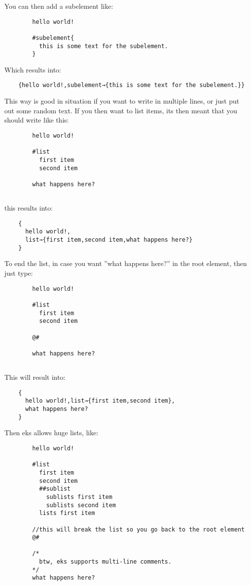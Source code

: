 \documentclass{book}
\begin{document}
	You can then add a subelement like:
	
	\begin{verbatim}
		hello world!
		
		#subelement{
		  this is some text for the subelement.
		}
	\end{verbatim}
	
	Which results into:
	
	\begin{verbatim}
	{hello world!,subelement→{this is some text for the subelement.}}
	\end{verbatim}
	
	This way is good in situation if you want to write in multiple lines, or just put out some random text.
	If you then want to list items, its then meant that you should write like this:
	
	\begin{verbatim}
		hello world!
		
		#list
		  first item
		  second item
			
		what happens here?
		
	\end{verbatim}
	
	this results into:
	
	\begin{verbatim}
	{
	  hello world!,
	  list→{first item,second item,what happens here?}
	}
	\end{verbatim}
	
	To end the list, in case you want ''what happens here?'' in the root element, then just type:
	
	\begin{verbatim}
		hello world!
		
		#list
		  first item
		  second item
		
		@#
		
		what happens here?
		
	\end{verbatim}
	
	This will result into:
	
	\begin{verbatim}
	{
	  hello world!,list→{first item,second item},
	  what happens here?
	}
	\end{verbatim}
	
	Then eks allows huge lists, like:
	
	\begin{verbatim}
		hello world!
		
		#list
		  first item
		  second item
		  ##sublist
		    sublists first item
		    sublists second item
		  lists first item
		  
		//this will break the list so you go back to the root element
		@#
		
		/*
		  btw, eks supports multi-line comments.
		*/
		what happens here?
		
	\end{verbatim}
	
\end{document}
